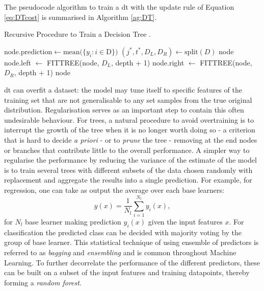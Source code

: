 The pseudocode algorithm to train a \gls{dt} with the update rule of Equation \ref{eq:DTcost} is summarised in Algorithm \ref{ag:DT}. 

\begin{algorithm}
    \caption{Recursive Procedure to Train a Decision Tree \cite{MurphyML}.}
    \begin{algorithmic}
        \State $\text{node.prediction} \gets \text{mean}(\{y_i : i \in $D$\})$ 
        \State $(j^*, t^*, D_L, D_R) \gets \text{split}(D)$
            \State \Return node
        \Else
            \State node.left $\gets$ FITTREE(node, $D_L$, depth + 1)
            \State node.right $\gets$ FITTREE(node, $D_R$, depth + 1)
            \State \Return node
        \EndIf
    \EndFunction
    \end{algorithmic}
    \label{ag:DT}
\end{algorithm}

\gls{dt} can overfit a dataset: the model may tune itself to specific features of the training set that are not generalisable to any set samples from the true original distribution. Regularisation serves as an important step to contain this often undesirable behaviour. For trees, a natural procedure to avoid overtraining is to interrupt the growth of the tree when it is no longer worth doing so - a criterion that is hard to decide \textit{a priori} - or to \textit{prune} the tree - removing at the end nodes or branches that contribute little to the overall performance. A simpler way to regularise the performance by reducing the variance of the estimate of the model is to train several trees with different subsets of the data chosen randomly with replacement and aggregate the results into a single prediction. For example, for regression, one can take as output the average over each base learners: \[ y(x) = \frac{1}{N_l} \sum_{i=1}^{N_l} y_i(x),\] for $N_l$ base learner making prediction $y_i(x)$ given the input features $x$. For classification the predicted class can be decided with majority voting by the group of base learner. This statistical technique of using ensemble of predictors is referred to as \textit{bagging} and \textit{ensembling} and is common throughout Machine Learning. To further decorrelate the performance of the different predictors, these can be built on a subset of the input features and training datapoints, thereby forming a \textit{random forest}.

